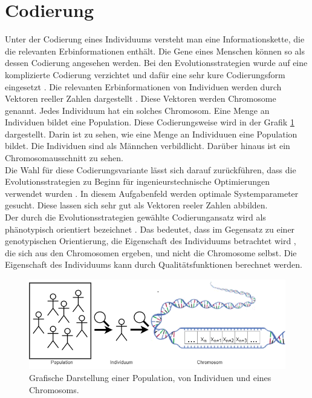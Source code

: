 \section{Codierung}
Unter der Codierung eines Individuums versteht man eine Informationskette, die die relevanten Erbinformationen enthält.
Die Gene eines Menschen können so als dessen Codierung angesehen werden.
Bei den Evolutionsstrategien wurde auf eine komplizierte Codierung verzichtet und dafür eine sehr kure Codierungsform eingesetzt \cite[S.147]{schoeneburg}. Die relevanten Erbinformationen von Individuen werden durch Vektoren reeller Zahlen dargestellt \cite[S.147]{schoeneburg}. Diese Vektoren werden Chromosome genannt. Jedes Individuum hat ein solches Chromosom.
Eine Menge an Individuen bildet eine Population. Diese Codierungsweise wird in der Grafik \ref{fig:codierung} dargestellt. Darin ist zu sehen, wie eine Menge an Individuuen eine Population bildet. Die Individuen sind als Männchen verbildlicht. Darüber hinaus ist ein Chromosomausschnitt zu sehen.\\
Die Wahl für diese Codierungsvariante lässt sich darauf zurückführen, dass die Evolutionsstrategien zu Beginn für ingenieurstechnische Optimierungen verwendet wurden \cite[S.147]{schoeneburg}.
In diesem Aufgabenfeld werden optimale Systemparameter gesucht. Diese lassen sich sehr gut als Vektoren reeler Zahlen abbilden.\\
Der durch die Evolutionsstrategien gewählte Codierungansatz wird als phänotypisch orientiert bezeichnet \cite[S.148]{schoeneburg}. Das bedeutet, dass im Gegensatz zu einer genotypischen Orientierung, die Eigenschaft des Individuums betrachtet wird , die sich aus den Chromosomen ergeben, und nicht die Chromosome selbst.
Die Eigenschaft des Individuums kann durch Qualitätsfunktionen berechnet werden.

\begin{figure}[!htb]
	\centering
	\includegraphics[width=1.\textwidth]{img/codierung/codierung.png}
	\caption{Grafische Darstellung einer Population, von Individuen und eines Chromosoms.}
\label{fig:codierung}
\end{figure}


